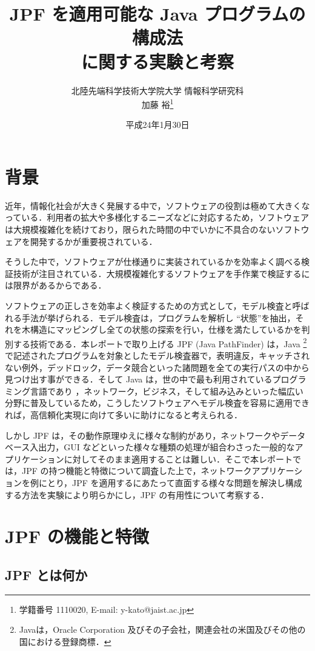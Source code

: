 \documentclass[a4j,12pt]{jarticle}
\title{JPF を適用可能な Java プログラムの構成法 \\ に関する実験と考察}
\author{北陸先端科学技術大学院大学 情報科学研究科 \\ 加藤 裕\thanks{学籍番号 1110020, E-mail: y-kato@jaist.ac.jp}}
\date{平成24年1月30日}
\begin{document}
\maketitle

\newpage
\setcounter{tocdepth}{3}
\tableofcontents
\section{背景}

近年，情報化社会が大きく発展する中で，ソフトウェアの役割は極めて大きくなっている．利用者の拡大や多様化するニーズなどに対応するため，ソフトウェアは大規模複雑化を続けており，限られた時間の中でいかに不具合のないソフトウェアを開発するかが重要視されている．

そうした中で，ソフトウェアが仕様通りに実装されているかを効率よく調べる検証技術が注目されている．大規模複雑化するソフトウェアを手作業で検証するには限界があるからである．

ソフトウェアの正しさを効率よく検証するための方式として，モデル検査と呼ばれる手法が挙げられる．モデル検査は，プログラムを解析し ``状態''を抽出，それを木構造にマッピングし全ての状態の探索を行い，仕様を満たしているかを判別する技術である．本レポートで取り上げる JPF  (Java PathFinder) \cite{JPF} は，Java \footnote{Javaは，Oracle Corporation 及びその子会社，関連会社の米国及びその他の国における登録商標．} で記述されたプログラムを対象としたモデル検査器で，表明違反，キャッチされない例外，デッドロック，データ競合といった諸問題を全ての実行パスの中から見つけ出す事ができる．そして Java は，世の中で最も利用されているプログラミング言語であり \cite{TIOBE}，ネットワーク，ビジネス，そして組み込みといった幅広い分野に普及しているため，こうしたソフトウェアへモデル検査を容易に適用できれば，高信頼化実現に向けて多いに助けになると考えられる．

しかし JPF は，その動作原理ゆえに様々な制約があり，ネットワークやデータベース入出力，GUI などといった様々な種類の処理が組合わさった一般的なアプリケーションに対してそのまま適用することは難しい．そこで本レポートでは，JPF の持つ機能と特徴について調査した上で，ネットワークアプリケーションを例にとり，JPF を適用するにあたって直面する様々な問題を解決し構成する方法を実験により明らかにし，JPF の有用性について考察する．

\section{JPF の機能と特徴}

\subsection{JPF とは何か}
\end{document}
